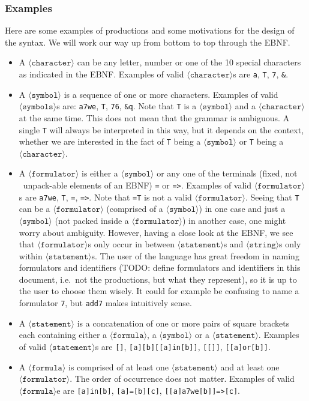 \documentclass[british]{article}
\newcommand\prv{bc}
\newcommand\m[1]{\texttt{#1}}
\begin{document}
\subsubsection{Examples}

Here are some examples of productions and some motivations for the
design of the syntax. We will work our way up from bottom to top through
the EBNF.
\begin{itemize}
\item A $\langle\texttt{character}\rangle$ can be any letter, number or
one of the 10 special characters as indicated in the EBNF\@. Examples
of valid $\langle\texttt{character}\rangle$s are \m{a}, \m{T},
\m{7}, \m{&}.
\item A $\langle\texttt{symbol}\rangle$ is a sequence of one or more characters.
Examples of valid $\langle\texttt{symbols}\rangle$s are: \m{a7we},
\m{T}, \m{76}, \m{&q}. Note that \m{T} is a $\langle\texttt{symbol}\rangle$
and a $\langle\texttt{character}\rangle$ at the same time. This does
not mean that the grammar is ambiguous. A single \m{T} will always
be interpreted in this way, but it depends on the context, whether
we are interested in the fact of \m{T} being a $\langle\texttt{symbol}\rangle$
or \m{T} being a $\langle\texttt{character}\rangle$.
\item A $\langle\texttt{formulator}\rangle$ is either a $\langle\texttt{symbol}\rangle$
or any one of the terminals (fixed, not \textquotedbl\ unpack-able\textquotedbl{}
elements of an EBNF) \m{=} or \m{=>}. Examples of valid $\langle\texttt{formulator}\rangle$s
are \m{a7we}, \m{T}, \m{=}, \m{=>}. Note that \m{=T} is not a
valid $\langle\texttt{formulator}\rangle$. Seeing that \m{T} can
be a $\langle\texttt{formulator}\rangle$ (comprised of a $\langle\texttt{symbol}\rangle$)
in one case and just a $\langle\texttt{symbol}\rangle$ (not packed
inside a $\langle\texttt{formulator}\rangle$) in another case, one
might worry about ambiguity. However, having a close look at the EBNF,
we see that $\langle\texttt{formulator}\rangle$s only occur in between
$\langle\texttt{statement}\rangle$s and $\langle\texttt{string}\rangle$s
only within $\langle\texttt{statement}\rangle$s. The user of the
language has great freedom in naming formulators and identifiers (TODO:
define formulators and identifiers in this document, i.e.\ not the
productions, but what they represent), so it is up to the user to
choose them wisely. It could for example be confusing to name a formulator
\m{7}, but \m{add7} makes intuitively sense.
\item A $\langle\texttt{statement}\rangle$ is a concatenation of one or
more pairs of square brackets each containing either a $\langle\texttt{formula}\rangle$,
a $\langle\texttt{symbol}\rangle$ or a $\langle\texttt{statement}\rangle$.
Examples of valid $\langle\texttt{statement}\rangle$s are \m{[]},
\m{[a][b][[a]in[b]]}, \m{[[]]}, \m{[[a]or[b]]}.
\item A $\langle\texttt{formula}\rangle$ is comprised of at least one $\langle\texttt{statement}\rangle$
and at least one $\langle\texttt{formulator}\rangle$. The order of
occurrence does not matter. Examples of valid $\langle\texttt{formula}\rangle$e
are \m{[a]in[b]}, \m{[a]=[b][c]}, \m{[[a]a7we[b]]=>[c]}.
\end{itemize}
\end{document}
